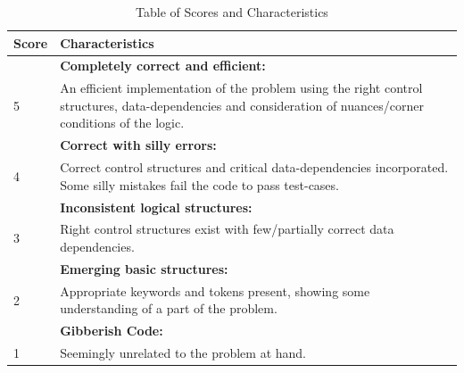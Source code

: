 \documentclass{article}
\begin{document}
  \begin{table}
    \centering%
    \caption{Table of Scores and Characteristics}

    \small
    \begin{tabular}{*{2}{p{.425\linewidth}}}%
      \toprule%
      Score &  Characteristics \\\midrule%
               & \textbf{Completely correct and efficient:}\\  
       5 & An efficient implementation of the problem using the right control structures, data-dependencies and consideration of nuances/corner conditions of the logic.  \\ \midrule%
       
              & \textbf{Correct with silly errors:}\\
      4 & Correct control structures and critical data-dependencies incorporated. Some silly mistakes fail the code to pass test-cases.\\ \midrule
      
              & \textbf{Inconsistent logical structures:}\\
      3 & Right control structures exist with few/partially correct data dependencies.\\ \midrule
      
              & \textbf{Emerging basic structures:}\\
      2 & Appropriate keywords and tokens present, showing some understanding of a part of the problem.\\ \midrule
      
              & \textbf{Gibberish Code:}\\
      1 & Seemingly unrelated to the problem at hand.\\
      
      \bottomrule
    \end{tabular}
  \end{table}
\end{document}
